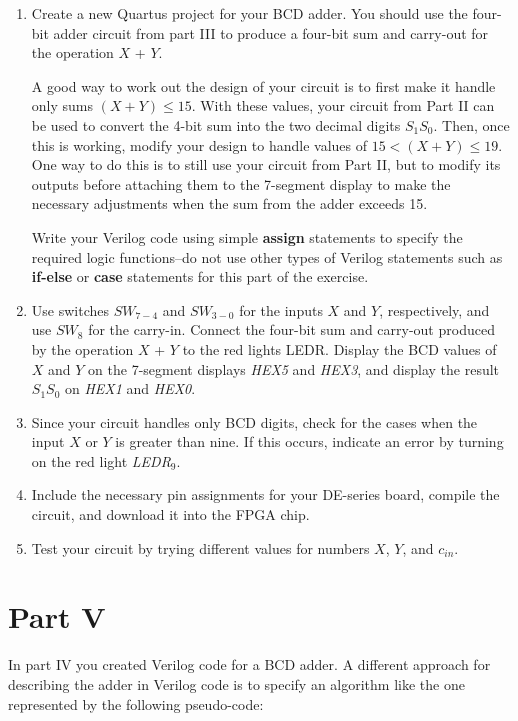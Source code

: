 \documentclass[epsfig,10pt,fullpage]{article}
\begin{document}
\begin{enumerate}
\item Create a new Quartus project for your BCD adder. You should use the
four-bit adder circuit from part III to produce a four-bit sum and carry-out for the
operation $X$ + $Y$. 

A good way to work out the design of your circuit is to first make it handle only sums
$(X + Y) \le 15$. With these values, your circuit from Part II can be used to convert the
4-bit sum into the two decimal digits $S_1 S_0$.  Then, once this is working, modify 
your design to handle values of $15 < (X + Y) \le 19$. One way to do this is to still use 
your circuit from Part II, but to modify its outputs before attaching them to the 7-segment 
display to make the necessary adjustments when the sum from the adder exceeds 15.

Write your Verilog code using
simple {\bf assign} statements to specify the required logic functions--do not use 
other types of Verilog
statements such as {\bf if-else} or {\bf case} statements for this part of the exercise.
\item Use switches $SW_{7-4}$ and $SW_{3-0}$ for the inputs $X$ and $Y$, respectively, and
use $SW_{8}$ for the carry-in. Connect the four-bit sum and carry-out produced 
by the operation $X$ + $Y$ to the red lights LEDR. Display the BCD values of $X$
and $Y$ on the 7-segment displays {\it HEX5} and {\it HEX3}, and display the result $S_1 S_0$ on
{\it HEX1} and {\it HEX0}.
\item Since your circuit handles only BCD digits, check for the cases when the input 
$X$ or $Y$ is greater than nine. If this occurs, indicate an error by turning on 
the red light {\it LEDR}$_9$.
\item Include the necessary pin assignments for your DE-series board, compile the circuit, and
download it into the FPGA chip.
\item Test your circuit by trying different values for numbers $X$, $Y$, and $c_{in}$.
\end{enumerate}

\section*{Part V}
In part IV you created Verilog code for a BCD adder. A different approach for describing
the adder in Verilog code is to specify an algorithm like the one
represented by the following pseudo-code:
\end{document}
